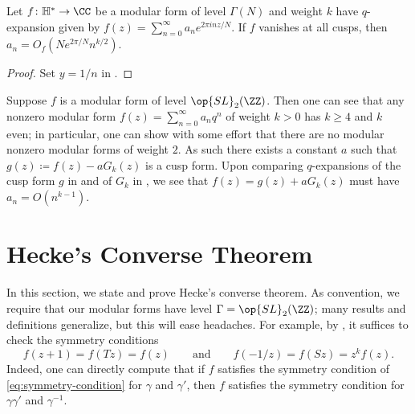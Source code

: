\documentclass{amsart}
\begin{document}
\begin{corollary} \label{cor:cusp-form-coeffs}
	Let $f\colon\mathbb H^*\to\CC$ be a modular form of level $\Gamma(N)$ and weight $k$ have $q$-expansion given by $f(z)=\sum_{n=0}^\infty a_ne^{2\pi inz/N}$. If $f$ vanishes at all cusps, then $a_n=O_f\left(Ne^{2\pi/N}n^{k/2}\right)$.
\end{corollary}
\begin{proof}
	Set $y=1/n$ in .
\end{proof}
\begin{remark} \label{rem:mod-forms-cusps}
	Suppose $f$ is a modular form of level $\op{SL}_2(\ZZ)$. Then one can see that any nonzero modular form $f(z)=\sum_{n=0}^\infty a_nq^n$ of weight $k>0$ has $k\ge4$ and $k$ even; in particular, one can show with some effort that there are no modular nonzero modular forms of weight $2$. As such there exists a constant $a$ such that $g(z)\coloneqq f(z)-aG_k(z)$ is a cusp form. Upon comparing $q$-expansions of the cusp form $g$ in  and of $G_k$ in , we see that $f(z)=g(z)+aG_k(z)$ must have $a_n=O\left(n^{k-1}\right)$.
\end{remark}


\section{Hecke's Converse Theorem}
In this section, we state and prove Hecke's converse theorem. As convention, we require that our modular forms have level $\Gamma=\op{SL}_2(\ZZ)$; many results and definitions generalize, but this will ease headaches. For example, by , it suffices to check the symmetry conditions
\begin{equation}
	f(z+1)=f(Tz)=f(z)\qquad\text{and}\qquad f(-1/z)=f(Sz)=z^kf(z). \label{eq:level-1-symmetry-condition}
\end{equation}
Indeed, one can directly compute that if $f$ satisfies the symmetry condition of \eqref{eq:symmetry-condition} for $\gamma$ and $\gamma'$, then $f$ satisfies the symmetry condition for $\gamma\gamma'$ and $\gamma^{-1}$.
\end{document}
